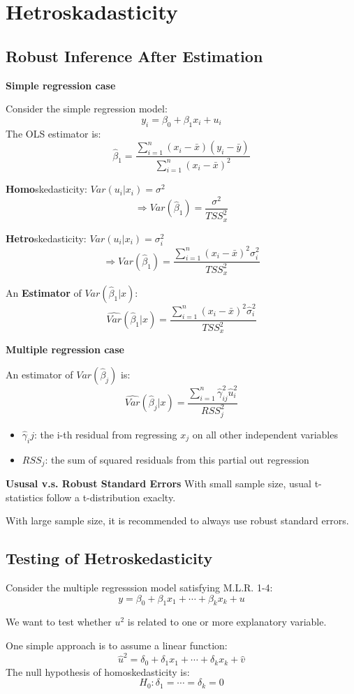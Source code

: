 \documentclass[11pt,a4paper]{article}
\begin{document}
\section{Hetroskadasticity}
\subsection{Robust Inference After Estimation}
\textbf{Simple regression case} \par
Consider the simple regression model:
\[
y_i = \beta_0 + \beta_1 x_i + u_i
\]
The OLS estimator is:
\[
\hat{\beta}_1 = \frac{\sum_{i=1}^n (x_i - \bar{x})(y_i - \bar{y})}{\sum_{i=1}^n (x_i - \bar{x})^2}
\]

\textbf{Homo}skedasticity: $Var(u_i|x_i) = \sigma^2$
\[
\Rightarrow Var(\hat{\beta}_1) = \frac{\sigma^2}{TSS_x^2}
\]

\textbf{Hetro}skedasticity: $Var(u_i|x_i) = \sigma_i^2$
\[
\Rightarrow Var(\hat{\beta}_1) = \frac{\sum_{i=1}^n (x_i - \bar{x})^2 \sigma_i^2}{TSS_x^2}
\]

An \textbf{Estimator} of $Var(\hat{\beta}_1|x)$:
\[
\widehat{Var}(\hat{\beta}_1|x) = \frac{\sum_{i=1}^n (x_i - \bar{x})^2 \hat{\sigma}_i^2}{TSS_x^2}
\]

\textbf{Multiple regression case} \par
An estimator of $Var(\hat{\beta}_j)$ is:
\[
\widehat{Var}(\hat{\beta}_j|x) = \frac{\sum_{i=1}^n \hat{\gamma}_{ij}^2 \hat{u}_i^2}{RSS_j^2}
\]
\begin{itemize}
    \item $\hat{\gamma}_ij$: the i-th residual from regressing $x_j$ on all other independent variables
    \item $RSS_j$: the sum of squared residuals from this partial out regression
\end{itemize}

\textbf{Ususal v.s. Robust Standard Errors}
With small sample size, usual t-statistics follow a t-distribution exaclty. \par
With large sample size, it is recommended to always use robust standard errors.

\subsection{Testing of Hetroskedasticity}
Consider the multiple regresssion model satisfying M.L.R. 1-4:
\[
y = \beta_0 + \beta_1 x_1 + \cdots + \beta_k x_k + u
\]

We want to test whether $u^2$ is related to one or more explanatory variable. \par
One simple approach is to assume a linear function:
\[
\hat{u}^2 = \delta_0 + \delta_1 x_1 + \cdots + \delta_k x_k + \hat{v}
\]
The null hypothesis of homoskedasticity is:
\[
H_0: \delta_1 = \cdots = \delta_k = 0
\]
\end{document}
